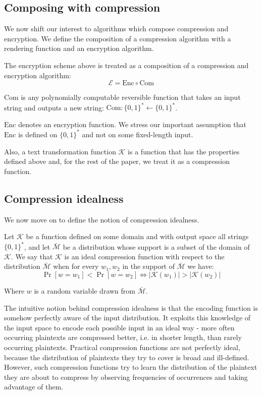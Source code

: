 \subsection{Composing with compression}\label{subsec:comcompose}

We now shift our interest to algorithms which compose compression and
encryption. We define the composition of a compression algorithm with a
rendering function and an encryption algorithm.

The encryption scheme above is treated as a composition of a
compression and encryption algorithm:
\begin{equation*}
    \mathcal{E} = \textrm{Enc} \circ \textrm{Com}
\end{equation*}

$\textrm{Com}$ is any polynomially computable reversible function that takes an
input string and outputs a new string: $\textrm{Com}: \{0, 1\}^* \leftarrow \{0,
1\}^*$.

$\textrm{Enc}$ denotes an encryption function. We stress our important
assumption that $\textrm{Enc}$ is defined on $\{0, 1\}^*$ and not on some
fixed-length input.

Also, a text transformation function $\mathcal{K}$ is a function that has the
properties defined above and, for the rest of the paper, we treat it as a
compression function.

\subsection{Compression idealness}\label{subsec:com_idealness}

We now move on to define the notion of compression idealness.

Let $\mathcal{K}$ be a function defined on some domain and with output space
all strings $\{0, 1\}^*$, and let $\bar{\mathcal{M}}$ be a distribution whose
support is a subset of the domain of $\mathcal{K}$.  We say that $\mathcal{K}$
is an ideal compression function with respect to the distribution
$\bar{\mathcal{M}}$ when for every $w_1, w_2$ in the support of
$\bar{\mathcal{M}}$ we have:
\begin{equation*}
\Pr[w = w_1] < \Pr[w = w_2] \iff \lvert\mathcal{K}(w_1)\rvert > \lvert\mathcal{K}(w_2)\rvert
\end{equation*}

Where $w$ is a random variable drawn from $\bar{\mathcal{M}}$.

The intuitive notion behind compression idealness is that the encoding
function is somehow perfectly aware of the input distribution. It
exploits this knowledge of the input space to encode each possible
input in an ideal way - more often occurring plaintexts are compressed
better, i.e. in shorter length, than rarely occurring plaintexts.
Practical compression functions are not perfectly ideal, because the
distribution of plaintexts they try to cover is broad and ill-defined.
However, such compression functions try to learn the distribution of
the plaintext they are about to compress by observing frequencies of
occurrences and taking advantage of them.

